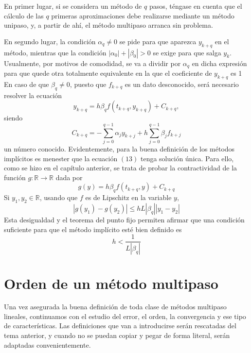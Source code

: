 \documentclass[11pt]{report}
\theoremstyle{mytheorem}
\theoremstyle{mydefinition}
\theoremstyle{myexample}
\newcommand{\R}{\mathbb R}
\newcommand{\bars}[1]{\left| #1 \right|}
\begin{document}
En primer lugar, si se considera un método de $q$ pasos, téngase en cuenta que el cálculo de las $q$ primeras aproximaciones debe realizarse mediante un método unipaso, y, a partir de ahí, el método multipaso arranca sin problema.

En segundo lugar, la condición $\alpha_q \neq 0$ se pide para que aparezca $y_{k+q}$ en el método, mientras que la condición $|\alpha_0|+|\beta_0|>0$ se exige para que salga $y_k$. Usualmente, por motivos de comodidad, se va a dividir por $\alpha_q$ en dicha expresión para que quede otra totalmente equivalente en la que el coeficiente de $y_{k+q}$ es 1 En caso de que $\beta_q \neq 0$, puesto que $f_{k+q}$ es un dato desconocido, será necesario resolver la ecuación
\begin{equation}y_{k+q} = h\beta_qf(t_{k+q},y_{k+q})+C_{k+q},\end{equation}
siendo
\[C_{k+q} = -\sum_{j=0}^{q-1}\alpha_jy_{k+j}+h\sum_{j=0}^{q-1}\beta_jf_{k+j}\]
un número conocido. Evidentemente, para la buena definición de los métodos implícitos es menester que la ecuación $(13)$ tenga solución única. Para ello, como se hizo en el capítulo anterior, se trata de probar la contractividad de la función $g \colon \R \to \R$ dada por
\[g(y)=h\beta_qf(t_{k+q},y)+C_{k+q}\]
Si $y_1,y_2 \in \R$, usando que $f$ es de Lipschitz en la variable $y$,
\[|g(y_1)-g(y_2)| \leq hL|\beta_q|\bars{y_1-y_2}\]
Esta desigualdad y el teorema del punto fijo permiten afirmar que una condición suficiente para que el método implícito esté bien definido es
\[h< \frac{1}{L|\beta_q|}\]

\section{Orden de un método multipaso}

Una vez asegurada la buena definición de toda clase de métodos multipaso lineales, continuamos con el estudio del error, el orden, la convergencia y ese tipo de características. Las definiciones que van a introducirse serán rescatadas del tema anterior, y cuando no se puedan copiar y pegar de forma literal, serán adaptadas convenientemente.
\end{document}
